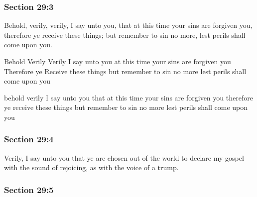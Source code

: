 	\subsubsection{Section 29:3} %
		\label{DC29-3}

		Behold, verily, verily, I say unto you, that at this time your sins are forgiven you, therefore ye receive these things; but remember to sin no more, lest perils shall come upon you.

		\begin{framed}
		\scriptsize
			\begin{compactdesc}
				\item[JSP] Behold Verily Verily I say unto you at this time your sins are forgiven you Therefore ye Receive these things but remember to sin no more lest perils shall come upon you
				\item[HSN] behold verily I say unto you that at this time your sins are forgiven you therefore ye receive these things but remember to sin no more lest perils shall come upon you
			\end{compactdesc}
		\end{framed}

	\subsubsection{Section 29:4} %
		\label{DC29-4}

		Verily, I say unto you that ye are chosen out of the world to declare my gospel with the sound of rejoicing, as with the voice of a trump.


	\subsubsection{Section 29:5} %
		\label{DC29-5}

